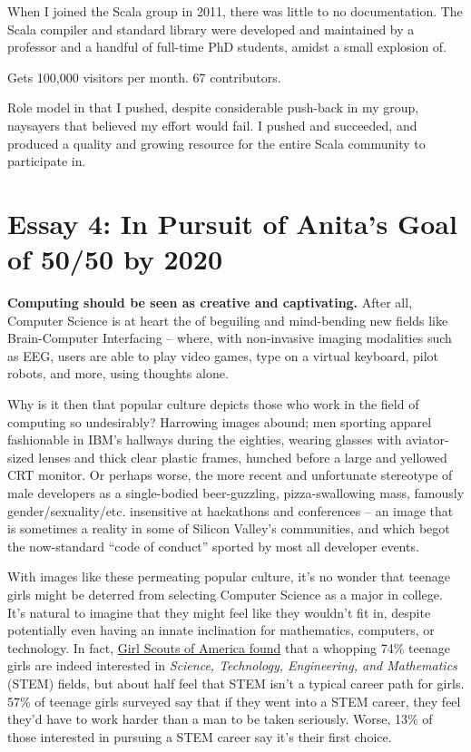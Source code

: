 \documentclass[acmtocl]{acmtrans2m}
\begin{document}
When I joined the Scala group in 2011, there was little to no documentation.
The Scala compiler and standard library were developed and maintained by a
professor and a handful of full-time PhD students, amidst a small explosion
of.

Gets 100,000 visitors per month. 67 contributors.

Role model in that I pushed, despite considerable push-back in my group, naysayers that believed my effort would fail. I pushed and succeeded, and produced a quality and growing resource for the entire Scala community to participate in.


\section*{\textbf{Essay 4:} In Pursuit of Anita's Goal of 50/50 by 2020}

\textbf{Computing should be seen as creative and captivating.}
After all, Computer Science is at heart the of beguiling and mind-bending new
fields like {Brain-Computer} Interfacing -- where, with non-invasive imaging
modalities such as EEG, users are able to play video games, type on a virtual
keyboard, pilot robots, and more, using thoughts alone.

Why is it then that popular culture depicts those who work in the field of
computing so undesirably? Harrowing images abound; men sporting apparel
fashionable in IBM's hallways during the eighties, wearing glasses with
aviator-sized lenses and thick clear plastic frames, hunched before a large
and yellowed CRT monitor. Or perhaps worse, the more recent and unfortunate
stereotype of male developers as a {single-bodied} {beer-guzzling},
{pizza-swallowing} mass, famously gender/sexuality/etc. insensitive at
hackathons and conferences -- an image that is sometimes a reality in
some of Silicon Valley's communities, and which begot the {now-standard} ``code
of conduct'' sported by most all developer events.

With images like these permeating popular culture, it's no wonder that teenage
girls might be deterred from selecting Computer Science as a major in college.
It's natural to imagine that they might feel like they wouldn't fit in,
despite potentially even having an innate inclination for mathematics,
computers, or technology. In fact,
\href{https://www.girlscouts.org/research/pdf/generation\_stem\_full\_report.pdf}{Girl Scouts of America found}
\cite{Girlscouts} that a whopping 74\% teenage girls are indeed interested in {\em
Science, Technology, Engineering, and Mathematics} (STEM) fields, but about
half feel that STEM isn't a typical career path for girls. 57\% of teenage
girls surveyed say that if they went into a STEM career, they feel they'd have
to work harder than a man to be taken seriously. Worse, 13\% of those
interested in pursuing a STEM career say it's their first choice.
\end{document}
